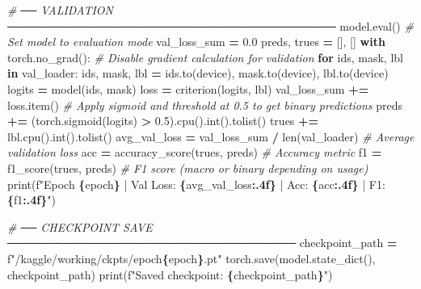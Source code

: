 \documentclass[
]{article}
\newenvironment{Shaded}{\begin{snugshade}}{\end{snugshade}}
\newcommand{\BuiltInTok}[1]{#1}
\newcommand{\CommentTok}[1]{\textcolor[rgb]{0.56,0.35,0.01}{\textit{#1}}}
\newcommand{\ControlFlowTok}[1]{\textcolor[rgb]{0.13,0.29,0.53}{\textbf{#1}}}
\newcommand{\FloatTok}[1]{\textcolor[rgb]{0.00,0.00,0.81}{#1}}
\newcommand{\KeywordTok}[1]{\textcolor[rgb]{0.13,0.29,0.53}{\textbf{#1}}}
\newcommand{\NormalTok}[1]{#1}
\newcommand{\OperatorTok}[1]{\textcolor[rgb]{0.81,0.36,0.00}{\textbf{#1}}}
\newcommand{\SpecialCharTok}[1]{\textcolor[rgb]{0.81,0.36,0.00}{\textbf{#1}}}
\newcommand{\SpecialStringTok}[1]{\textcolor[rgb]{0.31,0.60,0.02}{#1}}
\begin{document}
\begin{Shaded}
\begin{Highlighting}[]
    \CommentTok{\# ── VALIDATION ─────────────────────────────────────────}
\NormalTok{    model.}\BuiltInTok{eval}\NormalTok{()  }\CommentTok{\# Set model to evaluation mode}
\NormalTok{    val\_loss\_sum }\OperatorTok{=} \FloatTok{0.0}
\NormalTok{    preds, trues }\OperatorTok{=}\NormalTok{ [], []}
    \ControlFlowTok{with}\NormalTok{ torch.no\_grad():  }\CommentTok{\# Disable gradient calculation for validation}
        \ControlFlowTok{for}\NormalTok{ ids, mask, lbl }\KeywordTok{in}\NormalTok{ val\_loader:}
\NormalTok{            ids, mask, lbl }\OperatorTok{=}\NormalTok{ ids.to(device), mask.to(device), lbl.to(device)}
\NormalTok{            logits }\OperatorTok{=}\NormalTok{ model(ids, mask)}
\NormalTok{            loss   }\OperatorTok{=}\NormalTok{ criterion(logits, lbl)}
\NormalTok{            val\_loss\_sum }\OperatorTok{+=}\NormalTok{ loss.item()}
             \CommentTok{\# Apply sigmoid and threshold at 0.5 to get binary predictions}
\NormalTok{            preds }\OperatorTok{+=}\NormalTok{ (torch.sigmoid(logits) }\OperatorTok{\textgreater{}} \FloatTok{0.5}\NormalTok{).cpu().}\BuiltInTok{int}\NormalTok{().tolist()}
\NormalTok{            trues }\OperatorTok{+=}\NormalTok{ lbl.cpu().}\BuiltInTok{int}\NormalTok{().tolist()}
\NormalTok{    avg\_val\_loss }\OperatorTok{=}\NormalTok{ val\_loss\_sum }\OperatorTok{/} \BuiltInTok{len}\NormalTok{(val\_loader)  }\CommentTok{\# Average validation loss}
\NormalTok{    acc }\OperatorTok{=}\NormalTok{ accuracy\_score(trues, preds)             }\CommentTok{\# Accuracy metric}
\NormalTok{    f1  }\OperatorTok{=}\NormalTok{ f1\_score(trues, preds)                   }\CommentTok{\# F1 score (macro or binary depending on usage)}
    \BuiltInTok{print}\NormalTok{(}\SpecialStringTok{f"Epoch }\SpecialCharTok{\{}\NormalTok{epoch}\SpecialCharTok{\}}\SpecialStringTok{ | Val Loss: }\SpecialCharTok{\{}\NormalTok{avg\_val\_loss}\SpecialCharTok{:.4f\}}\SpecialStringTok{ | Acc: }\SpecialCharTok{\{}\NormalTok{acc}\SpecialCharTok{:.4f\}}\SpecialStringTok{ | F1: }\SpecialCharTok{\{}\NormalTok{f1}\SpecialCharTok{:.4f\}}\SpecialStringTok{"}\NormalTok{)}

    \CommentTok{\# ── CHECKPOINT SAVE ────────────────────────────────────}
\NormalTok{    checkpoint\_path }\OperatorTok{=} \SpecialStringTok{f"/kaggle/working/ckpts/epoch}\SpecialCharTok{\{}\NormalTok{epoch}\SpecialCharTok{\}}\SpecialStringTok{.pt"}
\NormalTok{    torch.save(model.state\_dict(), checkpoint\_path)}
    \BuiltInTok{print}\NormalTok{(}\SpecialStringTok{f"Saved checkpoint: }\SpecialCharTok{\{}\NormalTok{checkpoint\_path}\SpecialCharTok{\}}\SpecialStringTok{"}\NormalTok{)}


\end{Highlighting}
\end{Shaded}
\end{document}
